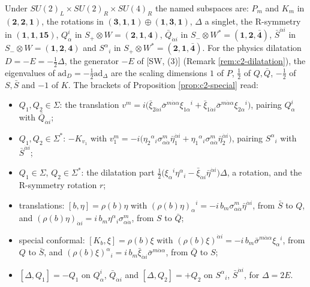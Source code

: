 \begin{remark}
Under $SU(2)_L\times SU(2)_R\times SU(4)_R$ the named subspaces are: $P_m$ and $K_m$ in $(\mathbf 2,\mathbf 2,\mathbf 1)$, the rotations in $(\mathbf 3,\mathbf 1,\mathbf 1)\oplus(\mathbf 1,\mathbf 3,\mathbf 1)$, $\Delta$ a singlet, the R-symmetry in $(\mathbf 1,\mathbf 1,\mathbf{15})$, $Q^i_\alpha$ in $S_+\otimes W=(\mathbf 2,\mathbf 1,\mathbf 4)$, $\bar Q_{\dot\alpha i}$ in $S_-\otimes W^*=(\mathbf 1,\mathbf 2,\bar{\mathbf 4})$, $\bar S^{\dot\alpha i}$ in $S_-\otimes W=(\mathbf 1,\mathbf 2,\mathbf 4)$ and $S^\alpha{}_i$ in $S_+\otimes W^*=(\mathbf 2,\mathbf 1,\bar{\mathbf 4})$. For the physics dilatation $D=-E=-\tfrac12\Delta$, the generator $-E$ of [SW, (3)] (Remark \ref{rem:c2-dilatation}), the eigenvalues of $\mathrm{ad}_D=-\tfrac12\mathrm{ad}_\Delta$ are the scaling dimensions $1$ of $P$, $\tfrac12$ of $Q,\bar Q$, $-\tfrac12$ of $S,\bar S$ and $-1$ of $K$. The brackets of Proposition \ref{prop:c2-special} read:
\begin{itemize}
\item $Q_1,Q_2\in\Sigma$: the translation $v^m=i\big(\bar\xi_{2\dot\alpha i}\bar\sigma^{m\dot\alpha\alpha}\xi_{1\alpha}{}^i+\bar\xi_{1\dot\alpha i}\bar\sigma^{m\dot\alpha\alpha}\xi_{2\alpha}{}^i\big)$, pairing $Q^i_\alpha$ with $\bar Q_{\dot\alpha i}$;
\item $Q_1,Q_2\in\Sigma^*$: $-K_{v_1}$ with $v_1^m=-i\big(\eta_2{}^\alpha{}_i\sigma^m_{\alpha\dot\alpha}\bar\eta_1^{\dot\alpha i}+\eta_1{}^\alpha{}_i\sigma^m_{\alpha\dot\alpha}\bar\eta_2^{\dot\alpha i}\big)$, pairing $S^\alpha{}_i$ with $\bar S^{\dot\alpha i}$;
\item $Q_1\in\Sigma$, $Q_2\in\Sigma^*$: the dilatation part $\tfrac12\big(\xi_\alpha{}^i\eta^\alpha{}_i-\bar\xi_{\dot\alpha i}\bar\eta^{\dot\alpha i}\big)\Delta$, a rotation, and the R-symmetry rotation $r$;
\item translations: $[b,\eta]=\rho(b)\eta$ with $(\rho(b)\eta)_\alpha{}^i=-i\,b_m\sigma^m_{\alpha\dot\alpha}\bar\eta^{\dot\alpha i}$, from $\bar S$ to $Q$, and $(\rho(b)\eta)_{\dot\alpha i}=i\,b_m\eta^\alpha{}_i\sigma^m_{\alpha\dot\alpha}$, from $S$ to $\bar Q$;
\item special conformal: $[K_b,\xi]=\rho(b)\xi$ with $(\rho(b)\xi)^{\dot\alpha i}=-i\,b_m\bar\sigma^{m\dot\alpha\alpha}\xi_\alpha{}^i$, from $Q$ to $\bar S$, and $(\rho(b)\xi)^\alpha{}_i=i\,b_m\bar\xi_{\dot\alpha i}\bar\sigma^{m\dot\alpha\alpha}$, from $\bar Q$ to $S$;
\item $[\Delta,Q_1]=-Q_1$ on $Q^i_\alpha$, $\bar Q_{\dot\alpha i}$ and $[\Delta,Q_2]=+Q_2$ on $S^\alpha{}_i$, $\bar S^{\dot\alpha i}$, for $\Delta=2E$.
\end{itemize}
\end{remark}

